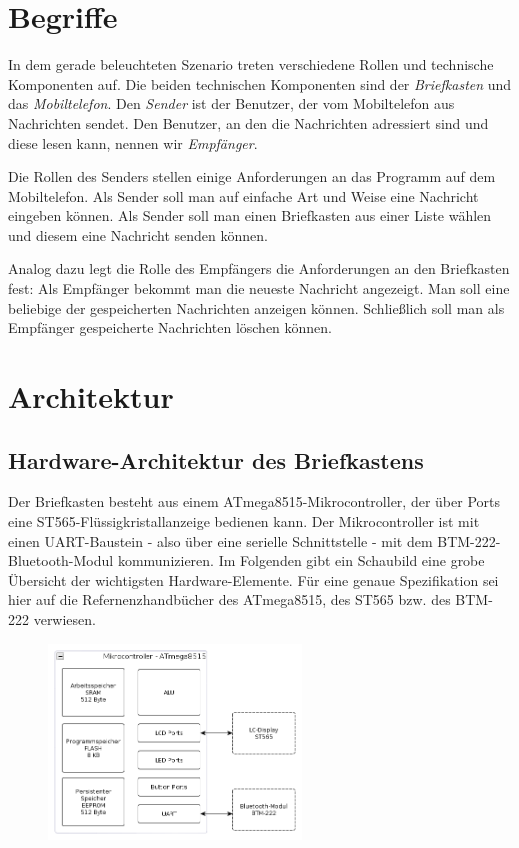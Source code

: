 \documentclass[ngerman]{article}
\begin{document}
\section{Begriffe}

In dem gerade beleuchteten Szenario treten verschiedene Rollen und technische Komponenten auf.
Die beiden technischen Komponenten sind der \textit{Briefkasten} und das \textit{Mobiltelefon}.
Den \textit{Sender} ist der Benutzer, der vom Mobiltelefon aus Nachrichten sendet. Den Benutzer,
an den die Nachrichten adressiert sind und diese lesen kann, nennen wir \textit{Empfänger}.

Die Rollen des Senders stellen einige Anforderungen an das Programm auf dem Mobiltelefon.
Als Sender soll man auf einfache Art und Weise eine Nachricht eingeben können. Als Sender soll
man einen Briefkasten aus einer Liste wählen und diesem eine Nachricht senden können.

Analog dazu legt die Rolle des Empfängers die Anforderungen an den Briefkasten fest:
Als Empfänger bekommt man die neueste Nachricht an\-gezeigt.
Man soll eine beliebige der gespeicherten Nachrichten anzeigen können. Schließlich soll man als
Empfänger gespeicherte Nachrichten löschen können.


\section{Architektur}

        \subsection{Hardware-Architektur des Briefkastens}

Der Briefkasten besteht aus einem ATmega8515-Mikrocontroller, der über Ports eine
ST565-Flüssigkristallanzeige bedienen kann. Der Mikrocontroller ist mit einen
UART-Baustein - also über eine serielle Schnittstelle - mit dem BTM-222-Bluetooth-Modul
kommunizieren. Im Folgenden gibt ein Schaubild eine grobe Übersicht der wichtigsten 
Hardware-Elemente. Für eine genaue Spezifikation sei hier auf die Refernenzhandbücher des ATmega8515, 
des ST565 bzw. des BTM-222 verwiesen. 

\begin{figure}[h!] \begin{center}
    \includegraphics[width=0.6\textwidth]{media/letterbox-atmega-arch}
\end{center} \end{figure}
\end{document}
